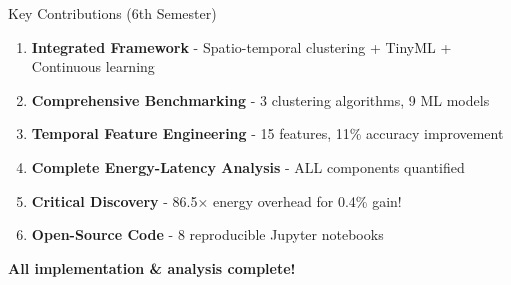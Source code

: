 \documentclass[aspectratio=169]{beamer}
\begin{document}
\begin{frame}{Key Contributions (6th Semester)}
\begin{enumerate}
    \item \textbf{Integrated Framework} - Spatio-temporal clustering + TinyML + Continuous learning

    \item \textbf{Comprehensive Benchmarking} - 3 clustering algorithms, 9 ML models

    \item \textbf{Temporal Feature Engineering} - 15 features, 11\% accuracy improvement

    \item \textbf{Complete Energy-Latency Analysis} - ALL components quantified

    \item \textbf{Critical Discovery} - 86.5× energy overhead for 0.4\% gain!

    \item \textbf{Open-Source Code} - 8 reproducible Jupyter notebooks
\end{enumerate}

\vspace{0.3cm}
\begin{center}
\colorbox{iiitlgreen!20}{\textbf{All implementation \& analysis complete!}}
\end{center}
\end{frame}
\end{document}
